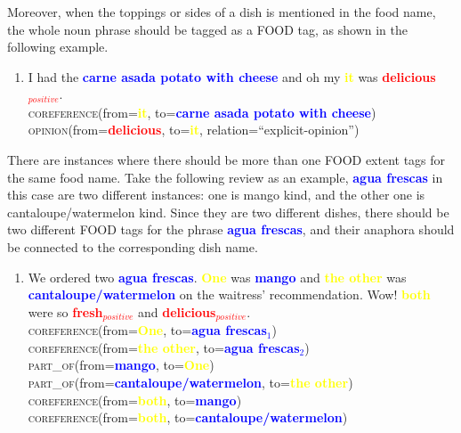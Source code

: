 \documentclass{article}
\begin{document}
Moreover, when the toppings or sides of a dish is mentioned in the food name, the whole noun phrase should be tagged as a FOOD tag, as shown in the following example.

\begin{enumerate}[resume]
	\item I had the \textbf{\textcolor{blue}{carne asada potato with cheese}} and oh my \textbf{\textcolor{yellow}{it}} was \textbf{\textcolor{red}{delicious$_{positive}$}}.\\
	\textsc{coreference}(from=\textbf{\textcolor{yellow}{it}}, to=\textbf{\textcolor{blue}{carne asada potato with cheese}})\\
		\textsc{opinion}(from=\textbf{\textcolor{red}{delicious}}, to=\textbf{\textcolor{yellow}{it}}, relation=``explicit-opinion'')\\
\end{enumerate}

There are instances where there should be more than one FOOD extent tags for the same food name. Take the following review as an example, \textbf{\textcolor{blue}{agua frescas}} in this case are two different instances: one is mango kind, and the other one is cantaloupe/watermelon kind. Since they are two different dishes, there should be two different FOOD tags for the phrase \textbf{\textcolor{blue}{agua frescas}}, and their anaphora should be connected to the corresponding dish name.

\begin{enumerate}[resume]
\item We ordered two \textbf{\textcolor{blue}{agua frescas}}. \textbf{\textcolor{yellow}{One}} was  \textbf{\textcolor{blue}{mango}} and \textbf{\textcolor{yellow}{the other}} was 
\textbf{\textcolor{blue}{cantaloupe/watermelon}} on the waitress' recommendation. Wow! 
\textbf{\textcolor{yellow}{both}} were so 
\textbf{\textcolor{red}{fresh$_{positive}$}} and 
\textbf{\textcolor{red}{delicious$_{positive}$}}.\\
\textsc{coreference}(from=\textbf{\textcolor{yellow}{One}}, to=\textbf{\textcolor{blue}{agua frescas$_{1}$}}) \\
\textsc{coreference}(from=\textbf{\textcolor{yellow}{the other}}, to=\textbf{\textcolor{blue}{agua frescas$_{2}$}}) \\
\textsc{part\_of}(from=\textbf{\textcolor{blue}{mango}}, to=\textbf{\textcolor{yellow}{One}})\\
\textsc{part\_of}(from=\textbf{\textcolor{blue}{cantaloupe/watermelon}}, to=\textbf{\textcolor{yellow}{the other}})\\
\textsc{coreference}(from=\textbf{\textcolor{yellow}{both}}, to=\textbf{\textcolor{blue}{mango}}) \\
\textsc{coreference}(from=\textbf{\textcolor{yellow}{both}}, to=\textbf{\textcolor{blue}{cantaloupe/watermelon}}) \\
\end{enumerate}
\end{document}

